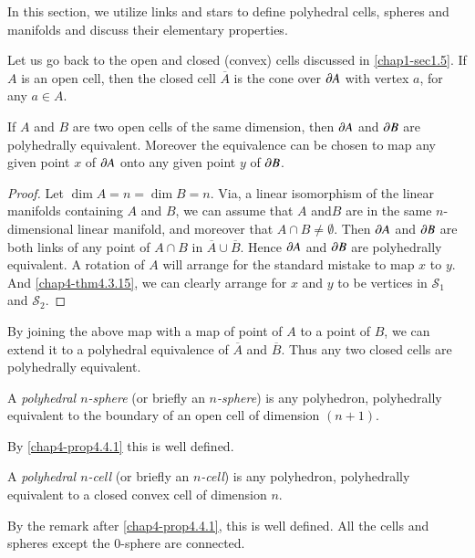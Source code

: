 In this section, we utilize links and stars to define polyhedral cells, spheres and manifolds and discuss their elementary properties.

Let us go back to the open and closed (convex) cells discussed in \ref{chap1-sec1.5}. If $A$ is an open cell, then the closed cell $\overline{A}$ is the cone over $\partial A$ with vertex $a$, for any $a\in A$.

\begin{proposition}\label{chap4-prop4.4.1}
If $A$ and $B$ are two open cells of the same dimension, then $\partial A$ and $\partial B$ are polyhedrally equivalent. Moreover the equivalence can be chosen to map any given point $x$ of $\partial A$ onto any given point $y$ of $\partial B$.
\end{proposition}

\begin{proof}
Let $\dim A=n=\dim B=n$. Via, a linear isomorphism of the linear manifolds containing $A$ and $B$, we can assume that $A$ and\pageoriginale $B$ are in the same $n$-dimensional linear manifold, and moreover that $A\cap B\neq \emptyset$. Then $\partial A$ and $\partial B$ are both links of any point of $A\cap B$ in $\overline{A}\cup \overline{B}$. Hence $\partial A$ and $\partial B$ are polyhedrally equivalent. A rotation of $A$ will arrange for the standard mistake to map $x$ to $y$. And \ref{chap4-thm4.3.15}, we can clearly arrange for $x$ and $y$ to be vertices in $\mathscr{S}_{1}$ and $\mathscr{S}_{2}$.
\end{proof}

By joining the above map with a map of point of $A$ to a point of $B$, we can extend it to a polyhedral equivalence of $\overline{A}$ and $\overline{B}$. Thus any two closed cells are polyhedrally equivalent.

\begin{definition}\label{chap4-defi4.4.2}
A {\em polyhedral $n$-sphere} (or briefly an {\em $n$-sphere}) is any polyhedron, polyhedrally equivalent to the boundary of an open cell of dimension $(n+1)$.
\end{definition}

By \ref{chap4-prop4.4.1} this is well defined.

\begin{definition}\label{chap4-defi4.4.3}
A {\em polyhedral $n$-cell} (or briefly an {\em $n$-cell}) is any polyhedron, polyhedrally equivalent to a closed convex cell of dimension $n$.
\end{definition}

By the remark after \ref{chap4-prop4.4.1}, this is well defined. All the cells and spheres except the $0$-sphere are connected.

